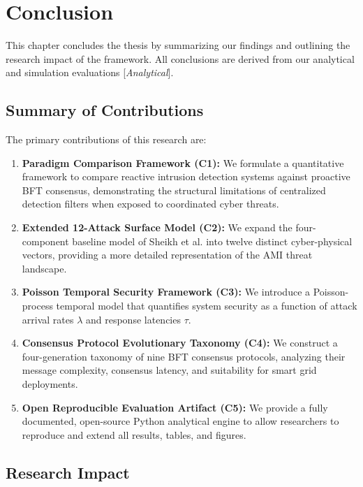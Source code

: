 \documentclass[12pt, oneside, a4paper]{report}
\theoremstyle{definition}
\theoremstyle{remark}
\newcommand{\analytical}{[\textit{Analytical}]}
\begin{document}
\chapter{Conclusion}
\label{ch:conclusion}

This chapter concludes the thesis by summarizing our findings and outlining the research impact of the framework. All conclusions are derived from our analytical and simulation evaluations \analytical.

\section{Summary of Contributions}
\label{sec:con:contributions}

The primary contributions of this research are:
\begin{enumerate}
  \item \textbf{Paradigm Comparison Framework (C1):} We formulate a quantitative framework to compare reactive intrusion detection systems against proactive BFT consensus, demonstrating the structural limitations of centralized detection filters when exposed to coordinated cyber threats.
  \item \textbf{Extended 12-Attack Surface Model (C2):} We expand the four-component baseline model of Sheikh et al. \cite{sheikh2020} into twelve distinct cyber-physical vectors, providing a more detailed representation of the AMI threat landscape.
  \item \textbf{Poisson Temporal Security Framework (C3):} We introduce a Poisson-process temporal model that quantifies system security as a function of attack arrival rates $\lambda$ and response latencies $\tau$.
  \item \textbf{Consensus Protocol Evolutionary Taxonomy (C4):} We construct a four-generation taxonomy of nine BFT consensus protocols, analyzing their message complexity, consensus latency, and suitability for smart grid deployments.
  \item \textbf{Open Reproducible Evaluation Artifact (C5):} We provide a fully documented, open-source Python analytical engine to allow researchers to reproduce and extend all results, tables, and figures.
\end{enumerate}

\section{Research Impact}
\label{sec:con:impact}
\end{document}
